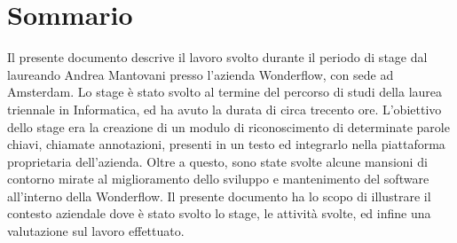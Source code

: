 \cleardoublepage
{}
\chapter*{Sommario}
\thispagestyle{empty}
Il presente documento descrive il lavoro svolto durante il periodo di stage dal
laureando Andrea Mantovani presso l’azienda Wonderflow, con sede ad Amsterdam.
Lo stage è stato svolto al termine del percorso di studi della laurea triennale
in Informatica, ed ha avuto la durata di circa trecento ore.
L’obiettivo dello stage era la creazione di un modulo di riconoscimento di
determinate parole chiavi, chiamate annotazioni, presenti in un testo ed
integrarlo nella piattaforma proprietaria dell'azienda. Oltre a questo, sono
state svolte alcune mansioni di contorno mirate al miglioramento dello sviluppo
e mantenimento del software all'interno della Wonderflow.
Il presente documento ha lo scopo di illustrare il contesto aziendale dove è
stato svolto lo stage, le attività svolte, ed infine una valutazione sul lavoro
effettuato.
\bigskip
